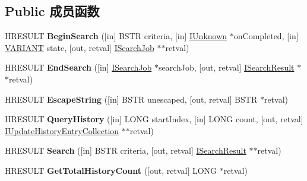 \subsection*{Public 成员函数}
\begin{DoxyCompactItemize}
\item 
\mbox{\label{interface_w_u_api_lib_1_1_i_update_searcher_af9af844ce4748cc3ea24d8f81dd95cd9}} 
H\+R\+E\+S\+U\+LT {\bfseries Begin\+Search} (\mbox{[}in\mbox{]} B\+S\+TR criteria, \mbox{[}in\mbox{]} \hyperlink{interface_i_unknown}{I\+Unknown} $\ast$on\+Completed, \mbox{[}in\mbox{]} \hyperlink{structtag_v_a_r_i_a_n_t}{V\+A\+R\+I\+A\+NT} state, \mbox{[}out, retval\mbox{]} \hyperlink{interface_w_u_api_lib_1_1_i_search_job}{I\+Search\+Job} $\ast$$\ast$retval)
\item 
\mbox{\label{interface_w_u_api_lib_1_1_i_update_searcher_a3c408a2363b8b95989e1e2f97542a306}} 
H\+R\+E\+S\+U\+LT {\bfseries End\+Search} (\mbox{[}in\mbox{]} \hyperlink{interface_w_u_api_lib_1_1_i_search_job}{I\+Search\+Job} $\ast$search\+Job, \mbox{[}out, retval\mbox{]} \hyperlink{interface_w_u_api_lib_1_1_i_search_result}{I\+Search\+Result} $\ast$$\ast$retval)
\item 
\mbox{\label{interface_w_u_api_lib_1_1_i_update_searcher_a624634a8575e00fdc6b68bab5d32ddb9}} 
H\+R\+E\+S\+U\+LT {\bfseries Escape\+String} (\mbox{[}in\mbox{]} B\+S\+TR unescaped, \mbox{[}out, retval\mbox{]} B\+S\+TR $\ast$retval)
\item 
\mbox{\label{interface_w_u_api_lib_1_1_i_update_searcher_afc012c6f596c11920467602136482462}} 
H\+R\+E\+S\+U\+LT {\bfseries Query\+History} (\mbox{[}in\mbox{]} L\+O\+NG start\+Index, \mbox{[}in\mbox{]} L\+O\+NG count, \mbox{[}out, retval\mbox{]} \hyperlink{interface_w_u_api_lib_1_1_i_update_history_entry_collection}{I\+Update\+History\+Entry\+Collection} $\ast$$\ast$retval)
\item 
\mbox{\label{interface_w_u_api_lib_1_1_i_update_searcher_a3b15550c35e49b4296afc7d22ca9c3c0}} 
H\+R\+E\+S\+U\+LT {\bfseries Search} (\mbox{[}in\mbox{]} B\+S\+TR criteria, \mbox{[}out, retval\mbox{]} \hyperlink{interface_w_u_api_lib_1_1_i_search_result}{I\+Search\+Result} $\ast$$\ast$retval)
\item 
\mbox{\label{interface_w_u_api_lib_1_1_i_update_searcher_a90d67555408b56036a12dc07cd9285ad}} 
H\+R\+E\+S\+U\+LT {\bfseries Get\+Total\+History\+Count} (\mbox{[}out, retval\mbox{]} L\+O\+NG $\ast$retval)
\end{DoxyCompactItemize}
